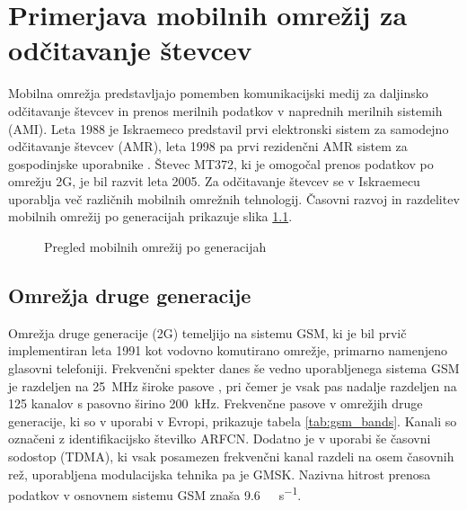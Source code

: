 \documentclass[a4paper,twoside,openright,12pt,slovene]{book}
\begin{document}

\chapter{Primerjava mobilnih omrežij za odčitavanje števcev} \label{Primerjava mobilnih omrežij za odčitavanje števcev}
    Mobilna omrežja predstavljajo pomemben komunikacijski medij za daljinsko odčitavanje števcev in prenos merilnih podatkov v naprednih merilnih sistemih (AMI). Leta 1988 je Iskraemeco predstavil prvi elektronski sistem za samodejno odčitavanje števcev (AMR), leta 1998 pa prvi rezidenčni AMR sistem za gospodinjske uporabnike \cite{Iskraemeco_80_let}. Števec MT372, ki je omogočal prenos podatkov po omrežju 2G, je bil razvit leta 2005.
    Za odčitavanje števcev se v Iskraemecu uporablja več različnih mobilnih omrežnih tehnologij. Časovni razvoj in razdelitev mobilnih omrežij po generacijah prikazuje slika \ref{omrezje}.
    
    \begin{figure}[H]
    \centering
    
    \caption{\label{omrezje} Pregled mobilnih omrežij po generacijah \cite{omrezja}}
    \end{figure}

\section{Omrežja druge generacije} \label{2G}

Omrežja druge generacije (2G) temeljijo na sistemu GSM, ki je bil prvič implementiran leta 1991 kot vodovno komutirano omrežje, primarno namenjeno glasovni telefoniji. Frekvenčni spekter danes še vedno uporabljenega sistema GSM je razdeljen na \SI{25}{\mega\hertz} široke pasove \cite{GPRS}, pri čemer je vsak pas nadalje razdeljen na 125 kanalov s pasovno širino \SI{200}{\kilo\hertz}. Frekvenčne pasove v omrežjih druge generacije, ki so v uporabi v Evropi, prikazuje tabela \ref{tab:gsm_bands}. Kanali so označeni z identifikacijsko številko ARFCN. Dodatno je v uporabi še časovni sodostop (TDMA), ki vsak posamezen frekvenčni kanal razdeli na osem časovnih rež, uporabljena modulacijska tehnika pa je GMSK. Nazivna hitrost prenosa podatkov v osnovnem sistemu GSM znaša \SI{9,6}{\kilo\bit\per\second}.
\end{document}
